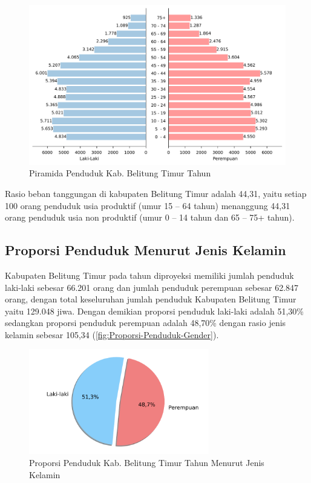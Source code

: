 \begin{figure}[!h]
    \centering{}
    \includegraphics[width=\textwidth]{bab_01/bab_01_1_piramidaPenduduk}
    \caption{Piramida Penduduk Kab. Belitung Timur Tahun \tP}
    \label{fig:Piramida-Penduduk-2022}
\end{figure}

Rasio beban tanggungan di kabupaten Belitung Timur adalah 44,31, yaitu setiap 100 orang penduduk usia produktif (umur 15 – 64 tahun) menanggung 44,31 orang penduduk usia non produktif (umur 0 – 14 tahun dan 65 – 75+ tahun).

\subsection{Proporsi Penduduk Menurut Jenis Kelamin}
Kabupaten Belitung Timur pada tahun \tP diproyeksi memiliki jumlah penduduk laki-laki sebesar 66.201 orang dan jumlah penduduk perempuan sebesar 62.847 orang, dengan total keseluruhan jumlah penduduk Kabupaten Belitung Timur yaitu 129.048 jiwa. Dengan demikian proporsi penduduk laki-laki adalah 51,30\% sedangkan proporsi penduduk perempuan adalah 48,70\% dengan rasio jenis kelamin sebesar 105,34 (\autoref{fig:Proporsi-Penduduk-Gender}).

\begin{figure}[!h]
    \centering{}
    \includegraphics[width=0.7\textwidth]{bab_01/bab_01_2_distribusiGender}
    \caption{Proporsi Penduduk Kab. Belitung Timur  Tahun \tP Menurut Jenis Kelamin}
    \label{fig:Proporsi-Penduduk-Gender}
\end{figure}

